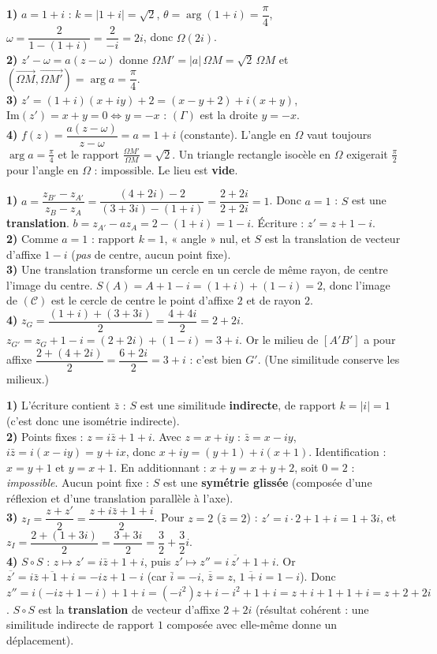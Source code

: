 \textbf{1)} $a=1+i$ : $k=|1+i|=\sqrt2$, $\theta=\arg(1+i)=\dfrac\pi4$, $\omega=\dfrac{2}{1-(1+i)}=\dfrac{2}{-i}=2i$,
donc $\Omega(2i)$.\\
\textbf{2)} $z'-\omega=a(z-\omega)$ donne $\Omega M'=|a|\,\Omega M=\sqrt2\,\Omega M$ et
$(\overrightarrow{\Omega M},\overrightarrow{\Omega M'})=\arg a=\dfrac\pi4$.\\
\textbf{3)} $z'=(1+i)(x+iy)+2=(x-y+2)+i(x+y)$, $\mathrm{Im}(z')=x+y=0\iff y=-x$ : $(\Gamma)$ est la droite $y=-x$.\\
\textbf{4)} $f(z)=\dfrac{a(z-\omega)}{z-\omega}=a=1+i$ (constante). L'angle en $\Omega$ vaut toujours $\arg a=\frac\pi4$
et le rapport $\frac{\Omega M'}{\Omega M}=\sqrt2$. Un triangle rectangle isocèle en $\Omega$ exigerait $\frac\pi2$ pour
l'angle en $\Omega$ : impossible. Le lieu est \textbf{vide}.

\textbf{1)} $a=\dfrac{z_{B'}-z_{A'}}{z_B-z_A}=\dfrac{(4+2i)-2}{(3+3i)-(1+i)}=\dfrac{2+2i}{2+2i}=1$. Donc $a=1$ :
$S$ est une \textbf{translation}. $b=z_{A'}-a z_A=2-(1+i)=1-i$. Écriture : $z'=z+1-i$.\\
\textbf{2)} Comme $a=1$ : rapport $k=1$, « angle » nul, et $S$ est la translation de vecteur d'affixe $1-i$
(\emph{pas} de centre, aucun point fixe).\\
\textbf{3)} Une translation transforme un cercle en un cercle de même rayon, de centre l'image du centre.
$S(A)=A+1-i=(1+i)+(1-i)=2$, donc l'image de $(\mathcal C)$ est le cercle de centre le point d'affixe $2$ et de
rayon $2$.\\
\textbf{4)} $z_G=\dfrac{(1+i)+(3+3i)}{2}=\dfrac{4+4i}{2}=2+2i$. $z_{G'}=z_G+1-i=(2+2i)+(1-i)=3+i$. Or le milieu de
$[A'B']$ a pour affixe $\dfrac{2+(4+2i)}{2}=\dfrac{6+2i}{2}=3+i$ : c'est bien $G'$. (Une similitude conserve les milieux.)

\textbf{1)} L'écriture contient $\bar z$ : $S$ est une similitude \textbf{indirecte}, de rapport $k=|i|=1$
(c'est donc une isométrie indirecte).\\
\textbf{2)} Points fixes : $z=i\bar z+1+i$. Avec $z=x+iy$ : $\bar z=x-iy$, $i\bar z=i(x-iy)=y+ix$, donc
$x+iy=(y+1)+i(x+1)$. Identification : $x=y+1$ et $y=x+1$. En additionnant : $x+y=x+y+2$, soit $0=2$ :
\emph{impossible}. Aucun point fixe : $S$ est une \textbf{symétrie glissée} (composée d'une réflexion et
d'une translation parallèle à l'axe).\\
\textbf{3)} $z_I=\dfrac{z+z'}{2}=\dfrac{z+i\bar z+1+i}{2}$. Pour $z=2$ ($\bar z=2$) : $z'=i\cdot2+1+i=1+3i$,
et $z_I=\dfrac{2+(1+3i)}{2}=\dfrac{3+3i}{2}=\dfrac32+\dfrac32 i$.\\
\textbf{4)} $S\circ S$ : $z\mapsto z'=i\bar z+1+i$, puis $z'\mapsto z''=i\,\overline{z'}+1+i$.
Or $\overline{z'}=\overline{i\bar z+1+i}=-i z+1-i$ (car $\bar i=-i$, $\overline{\bar z}=z$, $\overline{1+i}=1-i$).
Donc $z''=i(-iz+1-i)+1+i=(-i^2)z+i-i^2+1+i=z+i+1+1+i=z+2+2i$.
$S\circ S$ est la \textbf{translation} de vecteur d'affixe $2+2i$ (résultat cohérent : une similitude indirecte
de rapport $1$ composée avec elle-même donne un déplacement).

